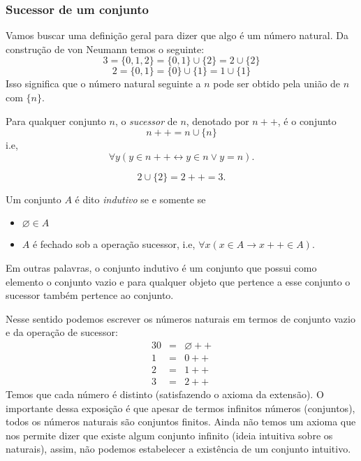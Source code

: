       \subsubsection{Sucessor de um conjunto}
         Vamos buscar uma definição geral para dizer que algo é um número natural.
         Da construção de von Neumann temos o seguinte:
         $$3 = \{0,1,2\} = \{0,1\} \cup \{2\} = 2 \cup \{2\}$$
         $$2 = \{0,1\} = \{0\} \cup \{1\} = 1 \cup \{1\}$$
         Isso significa que o número natural seguinte a $n$ pode ser obtido pela união de $n$ com $\{n\}$.
         \begin{definition}
            Para qualquer conjunto $n$, o \emph{sucessor} de $n$, denotado por $n++$, é o conjunto $$n++ = n \cup \{n\}$$
            i.e, $$\forall y(y \in n++ \leftrightarrow y \in n \lor y = n).$$
         \end{definition}
         \begin{exmp}
            $$2 \cup \{2\} = 2++ = 3.$$
         \end{exmp}
         \begin{definition}
            Um conjunto $A$ é dito \emph{indutivo} se e somente se
            \begin{itemize}
               \item $\varnothing \in A$
               \item $A$ é fechado sob a operação sucessor, i.e, $\forall x (x \in A \rightarrow x++ \in A).$
            \end{itemize}
         \end{definition}
         Em outras palavras, o conjunto indutivo é um conjunto que possui como elemento o conjunto vazio e para qualquer objeto que pertence a esse conjunto o sucessor também pertence ao conjunto.

         Nesse sentido podemos escrever os números naturais em termos de conjunto vazio e da operação de sucessor:
         \begin{alignat}{3}
            \nonumber 0 &=& \varnothing ++\\
            \nonumber 1 &=& 0++\\
            \nonumber 2 &=& 1++\\
            \nonumber 3 &=& 2++
         \end{alignat}
         Temos que cada número é distinto (satisfazendo o axioma da extensão). O importante dessa exposição é que apesar de termos infinitos números (conjuntos), todos os números naturais são conjuntos finitos. Ainda não temos um axioma que nos permite dizer que existe algum conjunto infinito (ideia intuitiva sobre os naturais), assim, não podemos estabelecer a existência de um conjunto intuitivo.
